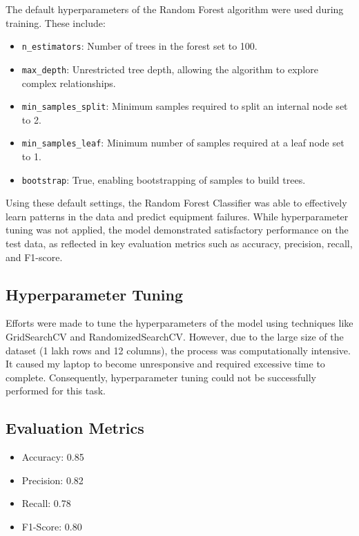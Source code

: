 	The default hyperparameters of the Random Forest algorithm were used during training. These include:
	\begin{itemize}
		\item \texttt{n\_estimators}: Number of trees in the forest set to 100.
		\item \texttt{max\_depth}: Unrestricted tree depth, allowing the algorithm to explore complex relationships.
		\item \texttt{min\_samples\_split}: Minimum samples required to split an internal node set to 2.
		\item \texttt{min\_samples\_leaf}: Minimum number of samples required at a leaf node set to 1.
		\item \texttt{bootstrap}: True, enabling bootstrapping of samples to build trees.
	\end{itemize}
	
	Using these default settings, the Random Forest Classifier was able to effectively learn patterns in the data and predict equipment failures. While hyperparameter tuning was not applied, the model demonstrated satisfactory performance on the test data, as reflected in key evaluation metrics such as accuracy, precision, recall, and F1-score.
	
	
	
	\subsection{Hyperparameter Tuning}
	Efforts were made to tune the hyperparameters of the model using techniques like GridSearchCV and RandomizedSearchCV. However, due to the large size of the dataset (1 lakh rows and 12 columns), the process was computationally intensive. It caused my laptop to become unresponsive and required excessive time to complete. Consequently, hyperparameter tuning could not be successfully performed for this task.
	
	
	
	\subsection{Evaluation Metrics}
	\begin{itemize}
		\item Accuracy: 0.85
		\item Precision: 0.82
		\item Recall: 0.78
		\item F1-Score: 0.80
	\end{itemize}
	
